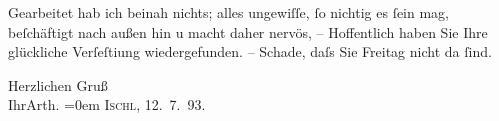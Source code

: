 \pstart
           Gearbeitet hab ich beinah nichts; alles ungewiſſe,{ }ſo nichtig es{ }ſein mag,
               beſchäftigt nach außen hin u macht daher nervös, – Hoffentlich haben {\pb}Sie Ihre glückliche Verſeſti{\geminationm}ung wiedergefunden. – Schade, daſs Sie Freitag nicht da{ }ſind.\pend
           
\pstart
           Herzlichen Gruß{\\[\baselineskip]}Ihr\spacefill\mbox{Arth.}\pend
           \leftskip=0em{}
\pstart
           \textsc{Ischl}, 12. 7. 93.\pend
           \endnumbering{}  \newcommand{\dateiname}{L00236}\newcommand{\titel}{Arthur Schnitzler an Hugo von Hofmannsthal, 12. 7. 1893}\newcommand{\editorInnen}{Martin Anton Müller und Gerd-Hermann Susen}
